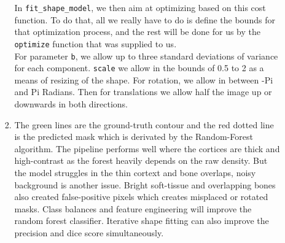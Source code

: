 \documentclass[
    a4paper,
    12pt,
    parskip=half,
]{scrarticle}
\begin{document}
\begin{enumerate}
\begin{enumerate}[label=\theenumi.\arabic*.]
\begin{enumerate}[label=\alph*)]
            In \texttt{fit\_shape\_model}, we then aim at optimizing based on this cost function. To do that, all we really have to do is define the bounds for that optimization process, and the rest will be done for us by the \texttt{optimize} function that was supplied to us.\\
            For parameter \texttt{b}, we allow up to three standard deviations of variance for each component. \texttt{scale} we allow in the bounds of 0.5 to 2 as a means of resizing of the shape.  For rotation, we allow in between -Pi and Pi Radians. Then for translations we allow half the image up or downwards in both directions.
            \item The green lines are the ground-truth contour and the red dotted line is the predicted mask which is derivated by the Random-Forest algorithm. The pipeline performs well where the cortices are thick and high-contrast as the forest heavily depends on the raw density. But the model struggles in the thin cortext and bone overlaps, noisy background is another issue.
            Bright soft-tissue  and overlapping bones also created false-positive pixels which creates misplaced or rotated masks. Class balances and feature engineering will improve the random forest classifier. Iterative shape fitting can also improve the precision and dice score simultaneously. 
        \end{enumerate}
    \end{enumerate}
\end{enumerate}
\end{document}
